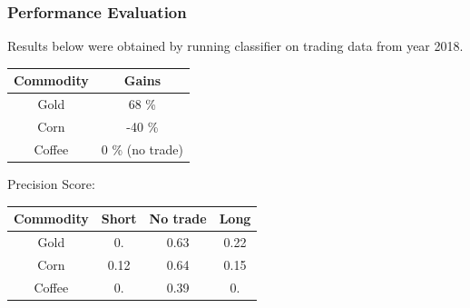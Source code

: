 \documentclass[final,2p]{elsarticle}
\begin{document}
\subsubsection{Performance Evaluation}

Results below were obtained by running classifier on trading data from year 2018.

\begin{center}
    \begin{tabular}{cc}
        Commodity & Gains \\
        \hline
        Gold & 68 \% \\
        Corn & -40 \% \\
        Coffee & 0 \% (no trade) \\
    \end{tabular}
\end{center}

Precision Score:
\begin{center}
    \begin{tabular}{cccc}
        Commodity & Short & No trade & Long \\
        \hline
        Gold & 0. & 0.63 & 0.22 \\
        Corn & 0.12 & 0.64 & 0.15 \\
        Coffee & 0. & 0.39 & 0. \\
    \end{tabular}
\end{center}
\end{document}

